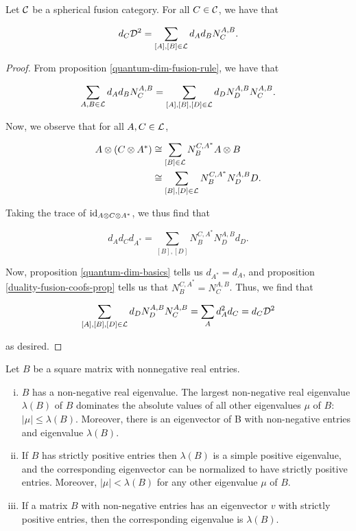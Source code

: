 \begin{prop}\label{global-dim-prop} Let ${\mathcal C}$ be a spherical fusion category. For all $C\in {\mathcal C}$, we have that

$$d_C {\mathcal D}^2=\sum_{[A],[B]\in {\mathcal L}}d_A d_B N^{A,B}_C.$$
\end{prop}
\begin{proof} From proposition \ref{quantum-dim-fusion-rule}, we have that

$$\sum_{A,B\in {\mathcal L}}d_A d_B N^{A,B}_C=\sum_{[A],[B],[D]\in {\mathcal L}}d_D N^{A,B}_D N^{A,B}_C.$$

Now, we observe that for all $A,C\in {\mathcal L}$,

\begin{align*}
A\otimes (C\otimes A^*)&\cong \sum_{[B]\in {\mathcal L}}N^{C,A^*}_{B} A\otimes B\\
&\cong \sum_{[B],[D]\in{\mathcal L}}N^{C,A^*}_{B} N^{A,B}_D D.
\end{align*}

Taking the trace of $\operatorname{id}_{A\otimes C\otimes A^*}$, we thus find that

$$d_{A}d_{C}d_{A^*}=\sum_{[B],[D]}N^{C,A^*}_{B}N^{A,B}_{D}d_D.$$

Now, proposition \ref{quantum-dim-basics} tells us $d_{A^*}=d_A$, and proposition \ref{duality-fusion-coofs-prop} tells us that $N^{C,A^*}_B=N^{A,B}_C$. Thus, we find that

$$\sum_{[A],[B],[D]\in {\mathcal L}}d_D N^{A,B}_D N^{A,B}_C=\sum_{A}d_A^2d_C=d_C{\mathcal D}^2$$

as desired.
\end{proof}

\begin{thrm}\label{frobenius-perron} Let $B$ be a square matrix with nonnegative real entries.

\begin{enumerate}[(i)]
\item $B$ has a non-negative real eigenvalue. The largest non-negative real eigenvalue $\lambda(B)$ of $B$ dominates the absolute values of all other eigenvalues $\mu$ of $B$: $|\mu|\leq \lambda(B)$. Moreover, there is an eigenvector of B with non-negative entries
and eigenvalue $\lambda(B)$.
\item If $B$ has strictly positive entries then $\lambda(B)$ is a simple positive eigenvalue, and the corresponding eigenvector can be normalized to have strictly positive entries. Moreover, $|\mu| < \lambda(B)$ for any other eigenvalue $\mu$ of $B$.
\item If a matrix $B$ with non-negative entries has an eigenvector $v$ with strictly
positive entries, then the corresponding eigenvalue is $\lambda(B)$.
\end{enumerate}
\end{thrm}

